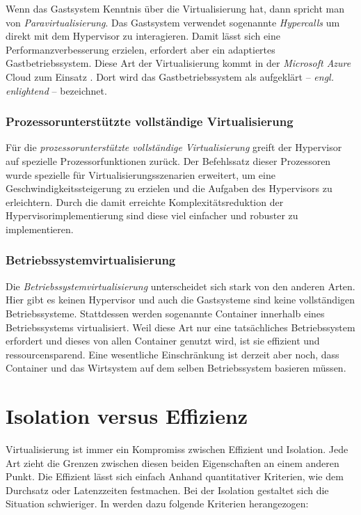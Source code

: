 Wenn das Gastsystem Kenntnis über die Virtualisierung hat, dann spricht man von \textit{Paravirtualisierung}. Das Gastsystem verwendet sogenannte \textit{Hypercalls} um direkt mit dem Hypervisor zu interagieren. Damit lässt sich eine Performanzverbesserung erzielen, erfordert aber ein adaptiertes Gastbetriebssystem. Diese Art der Virtualisierung kommt \zB in der \textit{Microsoft Azure} Cloud zum Einsatz \cite[30]{Krishnan10}. Dort wird das Gastbetriebssystem als aufgeklärt -- \textit{engl. enlightend} -- bezeichnet.

\subsubsection{Prozessorunterstützte vollständige Virtualisierung}

Für die \textit{prozessorunterstützte vollständige Virtualisierung} greift der Hypervisor auf spezielle Prozessorfunktionen zurück. Der Befehlssatz dieser Prozessoren wurde spezielle für Virtualisierungsszenarien erweitert, um eine Geschwindigkeitssteigerung zu erzielen und die Aufgaben des Hypervisors zu erleichtern. Durch die damit erreichte Komplexitätsreduktion der Hypervisorimplementierung sind diese viel einfacher und robuster zu implementieren.

\subsubsection{Betriebssystemvirtualisierung}

Die \textit{Betriebssystemvirtualisierung} unterscheidet sich stark von den anderen Arten. Hier gibt es keinen Hypervisor und auch die Gastsysteme sind keine vollständigen Betriebssysteme. Stattdessen werden sogenannte Container innerhalb eines Betriebssystems virtualisiert. Weil diese Art nur eine tatsächliches Betriebssystem erfordert und dieses von allen Container genutzt wird, ist sie effizient und ressourcensparend. Eine wesentliche Einschränkung ist derzeit aber noch, dass Container und das Wirtsystem auf dem selben Betriebssystem basieren müssen.

\section{Isolation versus Effizienz}
\label{sec:isolation-vs-efficiencys}

Virtualisierung ist immer ein Kompromiss zwischen Effizient und Isolation. Jede Art zieht die Grenzen zwischen diesen beiden Eigenschaften an einem anderen Punkt. Die Effizient lässt sich einfach Anhand quantitativer Kriterien, wie dem Durchsatz oder Latenzzeiten festmachen. Bei der Isolation gestaltet sich die Situation schwieriger. In \cite{Soltesz:2007:COS:1272996.1273025} werden dazu folgende Kriterien herangezogen:

